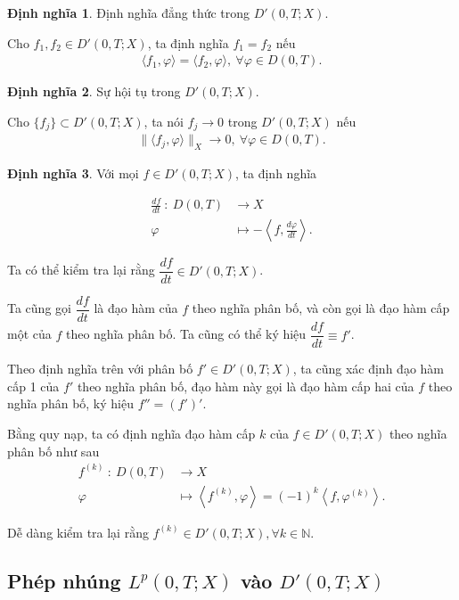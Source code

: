 \documentclass[12pt,a4paper]{article}
\theoremstyle{definition}
\newtheorem{definition}{Định nghĩa}[section]
\theoremstyle{definition}
\begin{document}
\begin{definition}
Định nghĩa đẳng thức trong $D'(0,T;X)$.
\end{definition}

Cho $f_1,f_2 \in D'(0,T;X)$, ta định nghĩa $f_1 = f_2$ nếu
\begin{align*}
    \langle f_1, \varphi \rangle = \langle f_2, \varphi \rangle,\ \forall \varphi \in D(0,T).
\end{align*}

\begin{definition}
Sự hội tụ trong $D'(0,T;X)$.
\end{definition}

Cho $\{f_j\} \subset D'(0,T;X)$, ta nói $f_j \to 0$ trong $D'(0,T;X)$ nếu
\begin{align*}
    \|\langle f_j, \varphi \rangle\|_X \to 0,\ \forall \varphi \in D(0,T).
\end{align*}

\begin{definition}
Với mọi $f \in D'(0,T;X)$, ta định nghĩa
\end{definition}
\begin{align*}
    \frac{df}{dt} \: : \: D(0,T) &\rightarrow X \\
    \varphi &\longmapsto - \left\langle f, \frac{d\varphi}{dt} \right\rangle.
\end{align*}

Ta có thể kiểm tra lại rằng $\dfrac{df}{dt} \in D'(0,T;X)$.

Ta cũng gọi $\dfrac{df}{dt}$ là đạo hàm của $f$ theo nghĩa phân bố, và còn gọi là đạo hàm cấp một của $f$ theo nghĩa phân bố. Ta cũng có thể ký hiệu $\dfrac{df}{dt} \equiv f'$.

Theo định nghĩa trên với phân bố $f' \in D'(0,T;X)$, ta cũng xác định đạo hàm cấp 1 của $f'$ theo nghĩa phân bố, đạo hàm này gọi là đạo hàm cấp hai của $f$ theo nghĩa phân bố, ký hiệu $f'' = (f')'$.

Bằng quy nạp, ta có định nghĩa đạo hàm cấp $k$ của $f \in D'(0,T;X)$ theo nghĩa phân bố như sau
\begin{align*}
    f^{(k)} \: : \: D(0,T) &\to X \\
    \varphi &\longmapsto \left\langle f^{(k)}, \varphi \right\rangle = (-1)^k \left\langle f, \varphi^{(k)} \right\rangle.
\end{align*}

Dễ dàng kiểm tra lại rằng $f^{(k)} \in D'(0,T;X), \forall k \in \mathbb{N}$.

\subsection{Phép nhúng $L^p(0,T;X)$ vào $D'(0,T;X)$}
\end{document}
